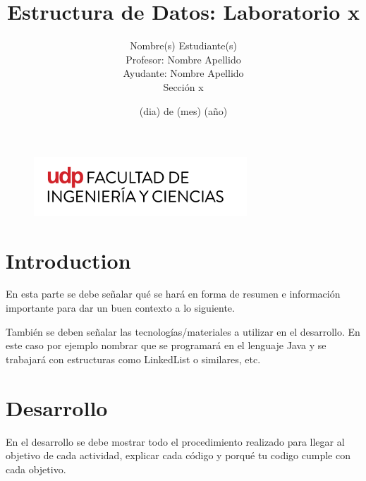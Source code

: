\documentclass[letter,12pt]{article}
\begin{document}
\begin{figure}[t]
\includegraphics[width=8cm]{Images/Universidad Logo.png}
\centering
\end{figure}

    \title{\Huge{Estructura de Datos: Laboratorio x}}

    \author{Nombre(s) Estudiante(s)\\Profesor: Nombre Apellido\\Ayudante: Nombre Apellido\\Sección x}

    \date{(dia) de (mes) (año)}

\maketitle

\newpage
    \tableofcontents
\newpage

\section{Introduction}

En esta parte se debe señalar qué se hará en forma de resumen e información importante para dar un buen contexto a lo siguiente.

También se deben señalar las tecnologías/materiales a utilizar en el desarrollo. En este caso por ejemplo nombrar que se programará en el lenguaje Java y se trabajará con estructuras como LinkedList o similares, etc.

\newpage

\section{Desarrollo}

En el desarrollo se debe mostrar todo el procedimiento realizado para llegar al objetivo de cada actividad, explicar cada código y porqué tu codigo cumple con cada objetivo.
\end{document}

